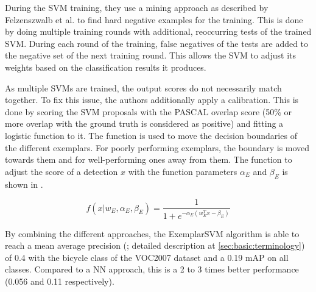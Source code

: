 During the \ac{SVM} training, they use a mining approach as described by Felzenszwalb et al. \cite{felzenszwalb2010object} to find hard negative examples for the training. This is done by doing multiple training rounds with additional, reoccurring tests of the trained \ac{SVM}. During each round of the training, false negatives of the tests are added to the negative set of the next training round. This allows the \ac{SVM} to adjust its weights based on the classification results it produces.

As multiple \acp{SVM} are trained, the output scores do not necessarily match together. To fix this issue, the authors additionally apply a calibration. This is done by scoring the \ac{SVM} proposals with the PASCAL overlap score (50\% or more overlap with the ground truth is considered as positive) and fitting a logistic function to it. The function is used to move the decision boundaries of the different exemplars. For poorly performing exemplars, the boundary is moved towards them and for well-performing ones away from them. The function to adjust the score of a detection $x$ with the function parameters $\alpha_E$ and $\beta_E$ is shown in .

\begin{equation}
f(x|w_E, \alpha_E, \beta_E) = \frac{1}{1 + e^{-\alpha_E (w^T_E x - \beta_E)} }
\label{eqn:esvm:calibration}
\end{equation}

By combining the different approaches, the ExemplarSVM algorithm is able to reach a mean average precision (; detailed description at \ref{sec:basic:terminology}) of 0.4 with the bicycle class of the \ac{VOC2007} dataset \cite{Pascal2007} and a 0.19 \ac{mAP} on all classes. Compared to a \ac{NN} approach, this is a 2 to 3 times better performance (0.056 and 0.11 respectively).
